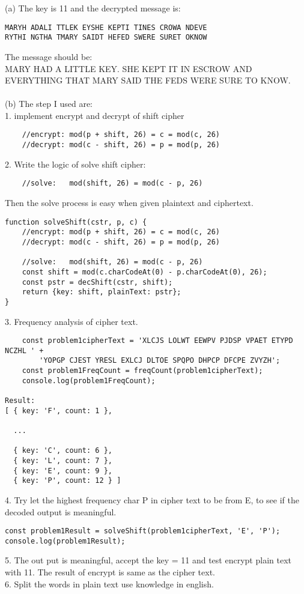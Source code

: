 \documentclass[paper=a4, fontsize=11pt]{scrartcl} %
\numberwithin{equation}{section} %
\numberwithin{figure}{section} %
\begin{document}
(a) The key is 11 and the decrypted message is: \\
\begin{lstlisting}
MARYH ADALI TTLEK EYSHE KEPTI TINES CROWA NDEVE
RYTHI NGTHA TMARY SAIDT HEFED SWERE SURET OKNOW
\end{lstlisting}
The message should be:\\
MARY HAD A LITTLE KEY. SHE KEPT IT IN ESCROW AND EVERYTHING THAT MARY SAID THE FEDS WERE SURE TO KNOW.\\
\\
(b) The step I used are:\\
1. implement encrypt and decrypt of shift cipher\\
\begin{lstlisting}
    //encrypt: mod(p + shift, 26) = c = mod(c, 26)
    //decrypt: mod(c - shift, 26) = p = mod(p, 26)
\end{lstlisting}
2. Write the logic of solve shift cipher:\\
\begin{lstlisting}
    //solve:   mod(shift, 26) = mod(c - p, 26)
\end{lstlisting}
Then the solve process is easy when given plaintext and ciphertext.\\
\begin{lstlisting}
function solveShift(cstr, p, c) {
    //encrypt: mod(p + shift, 26) = c = mod(c, 26)
    //decrypt: mod(c - shift, 26) = p = mod(p, 26)
    
    //solve:   mod(shift, 26) = mod(c - p, 26)
    const shift = mod(c.charCodeAt(0) - p.charCodeAt(0), 26);
    const pstr = decShift(cstr, shift);
    return {key: shift, plainText: pstr};
}
\end{lstlisting}

3. Frequency analysis of cipher text.\\
\begin{lstlisting}
    const problem1cipherText = 'XLCJS LOLWT EEWPV PJDSP VPAET ETYPD NCZHL ' +
        'YOPGP CJEST YRESL EXLCJ DLTOE SPQPO DHPCP DFCPE ZVYZH';
    const problem1FreqCount = freqCount(problem1cipherText);
    console.log(problem1FreqCount);

Result:     
[ { key: 'F', count: 1 },

  ...

  { key: 'C', count: 6 },
  { key: 'L', count: 7 },
  { key: 'E', count: 9 },
  { key: 'P', count: 12 } ]
\end{lstlisting}
4. Try let the highest frequency char P in cipher text to be from E, to see if the decoded output is meaningful.\\
\begin{lstlisting}
const problem1Result = solveShift(problem1cipherText, 'E', 'P');
console.log(problem1Result);
\end{lstlisting}
5. The out put is meaningful, accept the key = 11 and test encrypt plain text with 11. The result of encrypt is same as the cipher text.\\
6. Split the words in plain text use knowledge in english.\\
\end{document}
